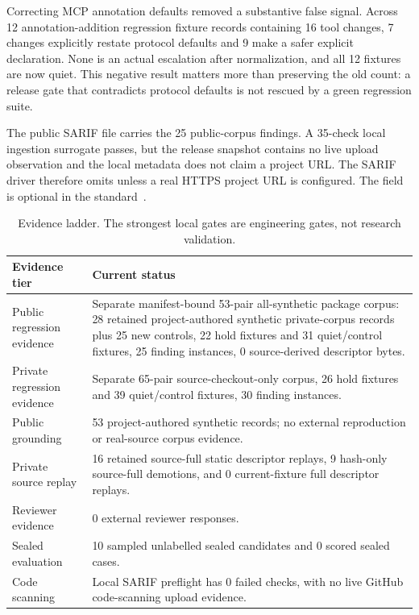 \documentclass[11pt,letterpaper]{article}
\newcommand{\code}[1]{\texttt{\detokenize{#1}}}
\newcommand{\sarif}{SARIF}
\begin{document}
Correcting MCP annotation defaults removed a substantive false signal. Across 12 annotation-addition regression fixture records containing 16 tool changes, 7 changes explicitly restate protocol defaults and 9 make a safer explicit declaration. None is an actual escalation after normalization, and all 12 fixtures are now quiet. This negative result matters more than preserving the old count: a release gate that contradicts protocol defaults is not rescued by a green regression suite.

The public \sarif{} file carries the 25 public-corpus findings. A 35-check local ingestion surrogate passes, but the release snapshot contains no live upload observation and the local metadata does not claim a project URL. The \sarif{} driver therefore omits \code{informationUri} unless a real HTTPS project URL is configured. The field is optional in the standard~\cite{sarif-oasis}.

\begin{table}[H]
\centering
\begin{tabularx}{\textwidth}{p{}Y}
\toprule
\textbf{Evidence tier} & \textbf{Current status} \\
\midrule
Public regression evidence & Separate manifest-bound 53-pair all-synthetic package corpus: 28 retained project-authored synthetic private-corpus records plus 25 new controls, 22 hold fixtures and 31 quiet/control fixtures, 25 finding instances, 0 source-derived descriptor bytes. \\
Private regression evidence & Separate 65-pair source-checkout-only corpus, 26 hold fixtures and 39 quiet/control fixtures, 30 finding instances. \\
Public grounding & 53 project-authored synthetic records; no external reproduction or real-source corpus evidence. \\
Private source replay & 16 retained source-full static descriptor replays, 9 hash-only source-full demotions, and 0 current-fixture full descriptor replays. \\
Reviewer evidence & 0 external reviewer responses. \\
Sealed evaluation & 10 sampled unlabelled sealed candidates and 0 scored sealed cases. \\
Code scanning & Local \sarif{} preflight has 0 failed checks, with no live GitHub code-scanning upload evidence. \\
\bottomrule
\end{tabularx}
\caption{Evidence ladder. The strongest local gates are engineering gates, not research validation.}
\end{table}
\end{document}
